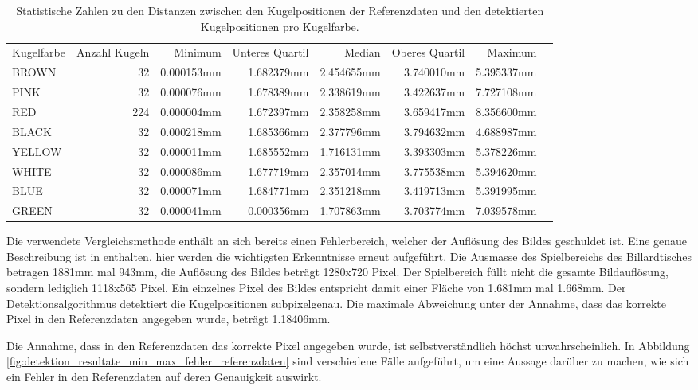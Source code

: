 \begin{table}[ht]
    \begin{tabular}{ lrrrrrrr }
        \rowcolor{\seccolor!50}
        Kugelfarbe & Anzahl Kugeln & Minimum & Unteres Quartil & Median & Oberes Quartil & Maximum\\
        BROWN & 32 & 0.000153mm & 1.682379mm & 2.454655mm & 3.740010mm & 5.395337mm \\
        PINK & 32 & 0.000076mm & 1.678389mm & 2.338619mm & 3.422637mm & 7.727108mm \\
        RED & 224 & 0.000004mm & 1.672397mm & 2.358258mm & 3.659417mm & 8.356600mm \\
        BLACK & 32 & 0.000218mm & 1.685366mm & 2.377796mm & 3.794632mm & 4.688987mm \\
        YELLOW & 32 & 0.000011mm & 1.685552mm & 1.716131mm & 3.393303mm & 5.378226mm \\
        WHITE & 32 & 0.000086mm & 1.677719mm & 2.357014mm & 3.775538mm & 5.394620mm \\
        BLUE & 32 & 0.000071mm & 1.684771mm & 2.351218mm & 3.419713mm & 5.391995mm \\
        GREEN & 32 & 0.000041mm & 0.000356mm & 1.707863mm & 3.703774mm & 7.039578mm
    \end{tabular}
    \caption{Statistische Zahlen zu den Distanzen zwischen den Kugelpositionen der Referenzdaten und den detektierten Kugelpositionen pro Kugelfarbe.}
    \label{tab:detektion_resultate_distanzen_stats_pro_kugelfarbe}
\end{table}

Die verwendete Vergleichsmethode enthält an sich bereits einen Fehlerbereich, welcher der Auflösung des Bildes geschuldet ist.
Eine genaue Beschreibung ist in \cite{project2:fehler_grundwahrheit} enthalten, hier werden die wichtigsten Erkenntnisse
erneut aufgeführt.
Die Ausmasse des Spielbereichs des Billardtisches betragen 1881mm mal 943mm, die Auflösung des Bildes beträgt 1280x720 Pixel.
Der Spielbereich füllt nicht die gesamte Bildauflösung, sondern lediglich 1118x565 Pixel.
Ein einzelnes Pixel des Bildes entspricht damit einer Fläche von 1.681mm mal 1.668mm.
Der Detektionsalgorithmus detektiert die Kugelpositionen subpixelgenau.
Die maximale Abweichung unter der Annahme, dass das korrekte Pixel in den Referenzdaten angegeben wurde, beträgt 1.18406mm.

Die Annahme, dass in den Referenzdaten das korrekte Pixel angegeben wurde, ist selbstverständlich höchst unwahrscheinlich.
In Abbildung \ref{fig:detektion_resultate_min_max_fehler_referenzdaten} sind verschiedene Fälle aufgeführt,
um eine Aussage darüber zu machen, wie sich ein Fehler in den Referenzdaten auf deren Genauigkeit auswirkt.

